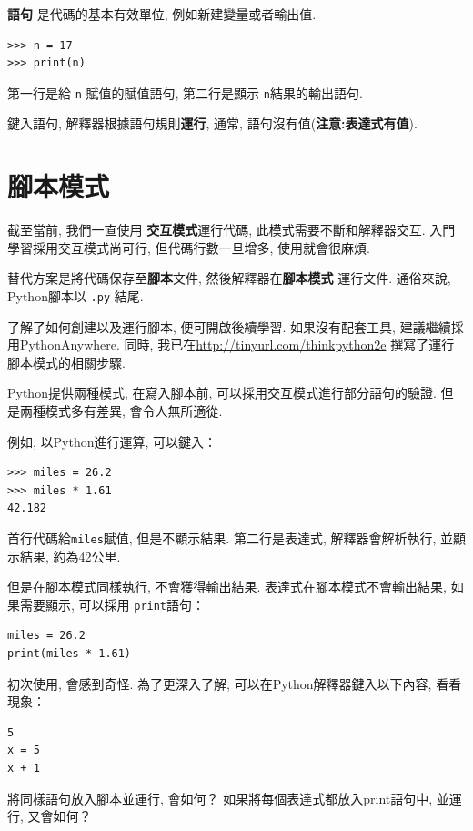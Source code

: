 \documentclass[10pt]{book}
\begin{document}
 {\bf 語句} 是代碼的基本有效單位, 例如新建變量或者輸出值. 

\begin{verbatim}
>>> n = 17
>>> print(n)
\end{verbatim}
%
第一行是給 {\tt n} 賦值的賦值語句, 第二行是顯示 {\tt n}結果的輸出語句. 

鍵入語句, 解釋器根據語句規則{\bf 運行}, 通常, 語句沒有值({\bf 注意:表達式有值}). 


\section{腳本模式}

截至當前, 我們一直使用 {\bf 交互模式}運行代碼, 
此模式需要不斷和解釋器交互. 
入門學習採用交互模式尚可行, 
但代碼行數一旦增多, 使用就會很麻煩. 

替代方案是將代碼保存至{\bf 腳本}文件, 然後解釋器在{\bf 腳本模式}
運行文件. 通俗來說, Python腳本以 {\tt .py} 結尾. 

了解了如何創建以及運行腳本, 便可開啟後續學習. 
如果沒有配套工具, 建議繼續採用PythonAnywhere. 
同時, 我已在\url{http://tinyurl.com/thinkpython2e}
撰寫了運行腳本模式的相關步驟. 

Python提供兩種模式, 在寫入腳本前, 
可以採用交互模式進行部分語句的驗證. 
但是兩種模式多有差異, 會令人無所適從. 

例如, 以Python進行運算, 可以鍵入：

\begin{verbatim}
>>> miles = 26.2
>>> miles * 1.61
42.182
\end{verbatim}

首行代碼給{\tt miles}賦值, 但是不顯示結果. 
第二行是表達式, 解釋器會解析執行, 並顯示結果, 約為42公里. 

但是在腳本模式同樣執行, 不會獲得輸出結果. 
表達式在腳本模式不會輸出結果, 如果需要顯示, 可以採用 {\tt print}語句：

\begin{verbatim}
miles = 26.2
print(miles * 1.61)
\end{verbatim}

初次使用, 會感到奇怪. 為了更深入了解, 
可以在Python解釋器鍵入以下內容, 看看現象：

\begin{verbatim}
5
x = 5
x + 1
\end{verbatim}

將同樣語句放入腳本並運行, 會如何？
如果將每個表達式都放入print語句中, 並運行, 又會如何？
\end{document}
